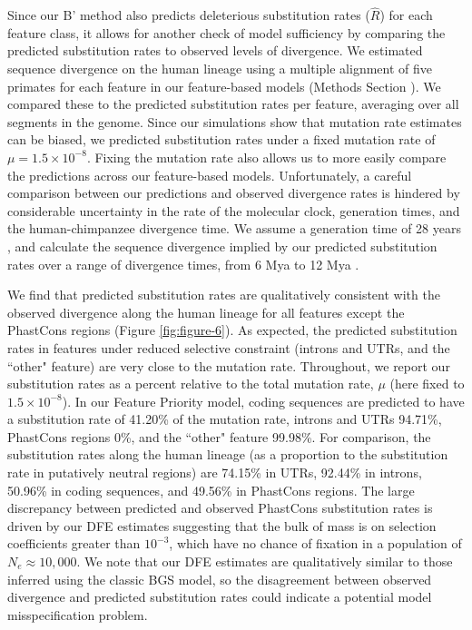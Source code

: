 \documentclass[11pt]{article}
\begin{document}
Since our B' method also predicts deleterious substitution rates ($\widehat{R}$) for each feature class, it allows for another check of model sufficiency by comparing the predicted substitution rates to observed levels of divergence. We estimated sequence divergence on the human lineage using a multiple
alignment of five primates for each feature in our feature-based models
(Methods Section ). We compared these to the predicted substitution rates per feature, averaging over all segments in the genome. Since our simulations show that mutation rate estimates can be biased, we predicted substitution rates under a fixed mutation rate of $\mu = 1.5 \times
10^{-8}$. Fixing the mutation rate also allows us to more easily compare the
predictions across our feature-based models. Unfortunately, a careful
comparison between our predictions and observed divergence rates is hindered by considerable uncertainty in the rate of the molecular clock, generation times, and the human-chimpanzee divergence time. We assume a generation time of 28 years \parencite{Fenner2005-yi}, and calculate the sequence divergence implied by our predicted
substitution rates over a range of divergence times, from 6 Mya to 12 Mya
\parencite{Moorjani2016-tb,Nachman2000-te,Yi2002-pw,Steiper2006-xx}.

We find that predicted substitution rates are qualitatively consistent with the observed divergence along the human lineage for all features except
the PhastCons regions (Figure \ref{fig:figure-6}). As expected, the predicted substitution rates in features under reduced selective constraint (introns and UTRs, and the ``other" feature) are very close to the mutation rate. Throughout, we report our substitution rates as a percent relative to the total mutation rate, $\mu$ (here fixed to $1.5 \times 10^{-8}$). In our Feature Priority model, coding sequences are predicted to have a substitution rate of 41.20\% of the mutation rate, introns and UTRs 94.71\%, PhastCons regions 0\%, and the ``other" feature 99.98\%. For comparison, the substitution rates along the human lineage
(as a proportion to the substitution rate in putatively neutral regions) are
74.15\% in UTRs, 92.44\% in introns, 50.96\% in coding sequences, and 49.56\%
in PhastCons regions. The large discrepancy between predicted and observed
PhastCons substitution rates is driven by our DFE estimates suggesting that the bulk of mass is on selection coefficients greater than $10^{-3}$, which have no chance of fixation in a population of $N_e \approx 10,000$. We note that our DFE estimates are qualitatively similar to those inferred using the classic BGS model, so the disagreement between observed divergence and predicted substitution rates could indicate a potential model misspecification problem.
\end{document}
